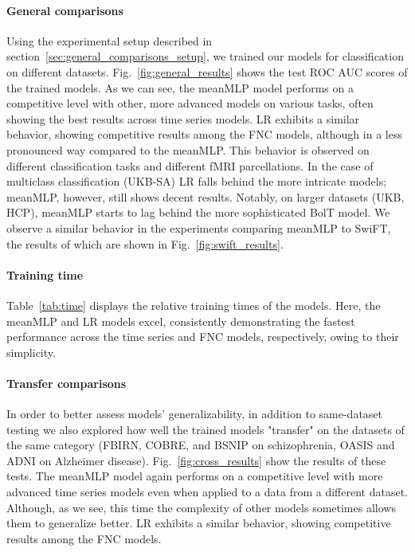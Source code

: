 \documentclass[final,5p,times,twocolumn,authoryear]{elsarticle}
\begin{document}
\paragraph{General comparisons}
Using the experimental setup described in section~\ref{sec:general_comparisons_setup}, we trained our models for classification on different datasets.  Fig.~\ref{fig:general_results} shows the test ROC AUC scores of the trained models. As we can see, the meanMLP model performs on a competitive level with other, more advanced models on various tasks, often showing the best results across time series models. LR exhibits a similar behavior, showing competitive results among the FNC models, although in a less pronounced way compared to the meanMLP. This behavior is observed on different classification tasks and different fMRI parcellations. In the case of multiclass classification (UKB-SA) LR falls behind the more intricate models; meanMLP, however, still shows decent results. Notably, on larger datasets (UKB, HCP), meanMLP starts to lag behind the more sophisticated BolT model. We observe a similar behavior in the experiments comparing meanMLP to SwiFT, the results of which are shown in Fig.~\ref{fig:swift_results}.

\paragraph{Training time}
Table~\ref{tab:time} displays the relative training times of the models. Here, the meanMLP and LR models excel, consistently demonstrating the fastest performance across the time series and FNC models, respectively, owing to their simplicity.

\paragraph{Transfer comparisons}
In order to better assess models' generalizability, in addition to same-dataset testing we also explored how well the trained models "transfer" on the datasets of the same category (FBIRN, COBRE, and BSNIP on schizophrenia, OASIS and ADNI on Alzheimer disease). Fig.~\ref{fig:cross_results} show the results of these tests. The meanMLP model again performs on a competitive level with more advanced time series models even when applied to a data from a different dataset. Although, as we see, this time the complexity of other models sometimes allows them to generalize better. LR exhibits a similar behavior, showing competitive results among the FNC models.
\end{document}
